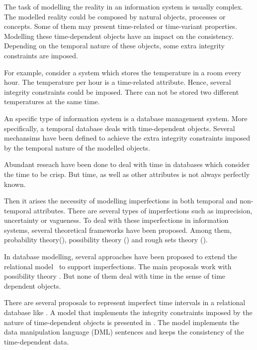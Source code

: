 The task of modelling the reality in an information system is usually complex. The modelled reality could be composed by natural objects, processes or concepts. Some of them may present time-related or time-variant properties. Modelling these time-dependent objects  have an impact on the consistency. Depending on the temporal nature of these objects, some extra integrity constraints are imposed.

For example, consider a system which stores the temperature in a room every hour. The temperature per hour is a time-related attribute. Hence, several integrity constraints could be imposed. There can not be stored two different temperatures at the same time.

An specific type of information system is a database management system. More specifically, a temporal database deals with time-dependent objects. Several mechansims have been defined to achieve the extra integrity constraints imposed by the temporal nature of the modelled objects.

Abundant reseach have been done to deal with time in databases  \cite{Jensen1991,Snodgrass1984,Nascimento1995,VanderCruyssen1997a,Jensen1995} which consider the time to be crisp. But time, as well as other attributes is not always perfectly known.


Then it arises the necessity of modelling imperfections in both temporal and non-temporal attributes. There are several types of imperfections such as imprecision, uncertainty or vagueness. To deal with these imperfections in information systems, several theoretical frameworks have been proposed. Among them, probability theory(\cite{Kolmogorov1933,Finetti1937}), possibility theory (\cite{Zadeh1965,LotfiZadeh1978,HenriPrade1982,DidierDubois1988a,Dubois2005}) and rough sets theory (\cite{Pawlak1995}).

In database modelling, several approaches have been proposed to extend the relational model~\cite{Codd1970,Ullman1982} to support imperfections. The main proposals work with possibility theory \cite{Buckles1982,Prade1984,Umano1980,Zemankova-Leech1984,Tre2004,Medina1994}. But none of them deal with time in the sense of time dependent objects.

There are several proposals to represent imperfect time intervals in a relational database like \cite{Garrido2009,Pons2011,Pons2012,JoseEnriquePons2012}. A model that implements the integrity constraints imposed by the nature of time-dependent objects is presented in \cite{Pons2012a}. The model implements the data manipulation language (DML) sentences and keeps the consistency of the time-dependent data.

